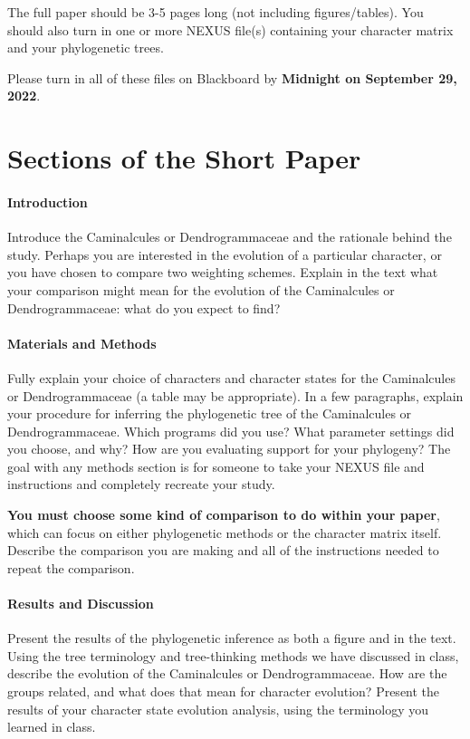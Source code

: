 \documentclass[12pt]{article}
\begin{document}
The full paper should be 3-5 pages long (not including figures/tables).
You should also turn in one or more NEXUS file(s) containing your character matrix and your phylogenetic trees.

Please turn in all of these files on Blackboard by \textbf{Midnight on September 29, 2022}.

\section{Sections of the Short Paper}

\paragraph{Introduction}
Introduce the Caminalcules or Dendrogrammaceae and the rationale behind the study. 
Perhaps you are interested in the evolution of a particular character, or you have chosen to compare two weighting schemes.
Explain in the text what your comparison might mean for the evolution of the Caminalcules or Dendrogrammaceae: what do you expect to find?

\paragraph{Materials and Methods}
Fully explain your choice of characters and character states for the Caminalcules or Dendrogrammaceae (a table may be appropriate).
In a few paragraphs, explain your procedure for inferring the phylogenetic tree of the Caminalcules or Dendrogrammaceae.
Which programs did you use? 
What parameter settings did you choose, and why?
How are you evaluating support for your phylogeny?
The goal with any methods section is for someone to take your NEXUS file and instructions and completely recreate your study.

\textbf{You must choose some kind of comparison to do within your paper}, which can focus on either phylogenetic methods or the character matrix itself.
Describe the comparison you are making and all of the instructions needed to repeat the comparison.


\paragraph{Results and Discussion}
Present the results of the phylogenetic inference as both a figure and in the text.
Using the tree terminology and tree-thinking methods we have discussed in class, describe the evolution of the Caminalcules or Dendrogrammaceae.
How are the groups related, and what does that mean for character evolution?
Present the results of your character state evolution analysis, using the terminology you learned in class.
\end{document}
